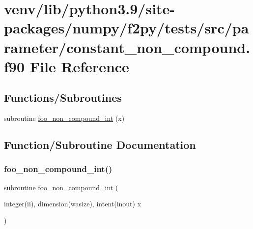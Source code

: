 \hypertarget{constant__non__compound_8f90}{}\section{venv/lib/python3.9/site-\/packages/numpy/f2py/tests/src/parameter/constant\+\_\+non\+\_\+compound.f90 File Reference}
\label{constant__non__compound_8f90}
\subsection*{Functions/\+Subroutines}
\begin{DoxyCompactItemize}
\item 
subroutine \hyperlink{constant__non__compound_8f90_a8f51f0039e4073b5cc551d25c9870d45}{foo\+\_\+non\+\_\+compound\+\_\+int} (x)
\end{DoxyCompactItemize}


\subsection{Function/\+Subroutine Documentation}
\mbox{\label{constant__non__compound_8f90_a8f51f0039e4073b5cc551d25c9870d45}} 
\subsubsection{\texorpdfstring{foo\+\_\+non\+\_\+compound\+\_\+int()}{foo\_non\_compound\_int()}}
{\footnotesize\ttfamily subroutine foo\+\_\+non\+\_\+compound\+\_\+int (\begin{DoxyParamCaption}\item[{integer(ii), dimension(wasize), intent(inout)}]{x }\end{DoxyParamCaption})}

